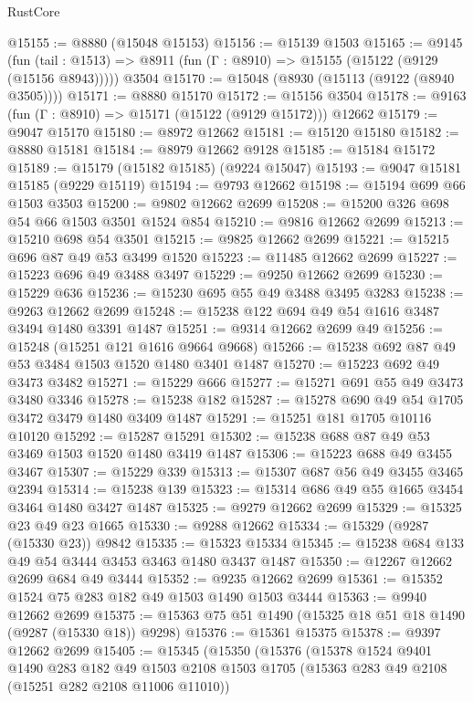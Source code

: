 \begin{lexlean}{RustCore}
\begin{coremodule}
@15155 := @8880 (@15048 @15153)
@15156 := @15139 @1503
@15165 := @9145
    (fun (tail : @1513) => @8911 (fun (Γ : @8910) => @15155 (@15122 (@9129 (@15156 @8943)))))
    @3504
@15170 := @15048 (@8930 (@15113 (@9122 (@8940 @3505))))
@15171 := @8880 @15170
@15172 := @15156 @3504
@15178 := @9163 (fun (Γ : @8910) => @15171 (@15122 (@9129 @15172))) @12662
@15179 := @9047 @15170
@15180 := @8972 @12662
@15181 := @15120 @15180
@15182 := @8880 @15181
@15184 := @8979 @12662 @9128
@15185 := @15184 @15172
@15189 := @15179 (@15182 @15185) (@9224 @15047)
@15193 := @9047 @15181 @15185 (@9229 @15119)
@15194 := @9793 @12662
@15198 := @15194 @699 @66 @1503 @3503
@15200 := @9802 @12662 @2699
@15208 := @15200 @326 @698 @54 @66 @1503 @3501 @1524 @854
@15210 := @9816 @12662 @2699
@15213 := @15210 @698 @54 @3501
@15215 := @9825 @12662 @2699
@15221 := @15215 @696 @87 @49 @53 @3499 @1520
@15223 := @11485 @12662 @2699
@15227 := @15223 @696 @49 @3488 @3497
@15229 := @9250 @12662 @2699
@15230 := @15229 @636
@15236 := @15230 @695 @55 @49 @3488 @3495 @3283
@15238 := @9263 @12662 @2699
@15248 := @15238 @122 @694 @49 @54 @1616 @3487 @3494 @1480 @3391 @1487
@15251 := @9314 @12662 @2699 @49
@15256 := @15248 (@15251 @121 @1616 @9664 @9668)
@15266 := @15238 @692 @87 @49 @53 @3484 @1503 @1520 @1480 @3401 @1487
@15270 := @15223 @692 @49 @3473 @3482
@15271 := @15229 @666
@15277 := @15271 @691 @55 @49 @3473 @3480 @3346
@15278 := @15238 @182
@15287 := @15278 @690 @49 @54 @1705 @3472 @3479 @1480 @3409 @1487
@15291 := @15251 @181 @1705 @10116 @10120
@15292 := @15287 @15291
@15302 := @15238 @688 @87 @49 @53 @3469 @1503 @1520 @1480 @3419 @1487
@15306 := @15223 @688 @49 @3455 @3467
@15307 := @15229 @339
@15313 := @15307 @687 @56 @49 @3455 @3465 @2394
@15314 := @15238 @139
@15323 := @15314 @686 @49 @55 @1665 @3454 @3464 @1480 @3427 @1487
@15325 := @9279 @12662 @2699
@15329 := @15325 @23 @49 @23 @1665
@15330 := @9288 @12662
@15334 := @15329 (@9287 (@15330 @23)) @9842
@15335 := @15323 @15334
@15345 := @15238 @684 @133 @49 @54 @3444 @3453 @3463 @1480 @3437 @1487
@15350 := @12267 @12662 @2699 @684 @49 @3444
@15352 := @9235 @12662 @2699
@15361 := @15352 @1524 @75 @283 @182 @49 @1503 @1490 @1503 @3444
@15363 := @9940 @12662 @2699
@15375 := @15363 @75 @51 @1490 (@15325 @18 @51 @18 @1490 (@9287 (@15330 @18)) @9298)
@15376 := @15361 @15375
@15378 := @9397 @12662 @2699
@15405 := @15345
    (@15350
      (@15376
        (@15378
          @1524
          @9401
          @1490
          @283
          @182
          @49
          @1503
          @2108
          @1503
          @1705
          (@15363 @283 @49 @2108 (@15251 @282 @2108 @11006 @11010))

\end{coremodule}
\end{lexlean}
